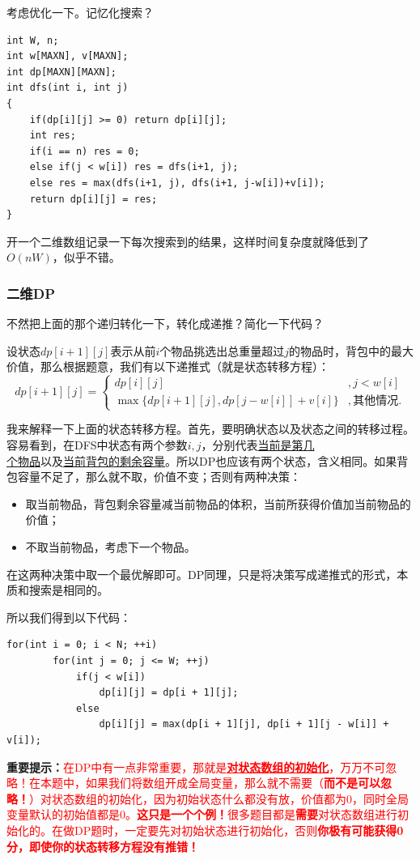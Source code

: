 \documentclass{article}
\theoremstyle{nonumberplain}
\begin{document}
考虑优化一下。记忆化搜索？
\begin{verbatim}
int W, n;    
int w[MAXN], v[MAXN];  
int dp[MAXN][MAXN];  
int dfs(int i, int j)
{  
    if(dp[i][j] >= 0) return dp[i][j];  
    int res;   
    if(i == n) res = 0; 
    else if(j < w[i]) res = dfs(i+1, j);   
    else res = max(dfs(i+1, j), dfs(i+1, j-w[i])+v[i]);  
    return dp[i][j] = res;  
}
\end{verbatim}

开一个二维数组记录一下每次搜索到的结果，这样时间复杂度就降低到了$O(nW)$，似乎不错。
\subsubsection{二维DP}
不然把上面的那个递归转化一下，转化成递推？简化一下代码？

设状态$dp[i+1][j]$表示从前$i$个物品挑选出总重量超过$j$的物品时，背包中的最大价值，那么根据题意，我们有以下递推式（就是状态转移方程）：
\begin{equation*}
	dp[i+1][j]=\begin{cases}
		dp[i][j]                        & ,j<w[i]   \\
		\max\{dp[i+1][j],dp[j-w[i]]+v[i]\} & ,其他情况.
	\end{cases}
\end{equation*}

我来解释一下上面的状态转移方程。首先，要明确状态以及状态之间的转移过程。容易看到，在DFS中状态有两个参数$i,j$，分别代表\underline{当前是第几}\\\underline{个物品}以及\underline{当前背包的剩余容量}。所以DP也应该有两个状态，含义相同。如果背包容量不足了，那么就不取，价值不变；否则有两种决策：
\begin{itemize}
	\item{取当前物品，背包剩余容量减当前物品的体积，当前所获得价值加当前物品的价值；}
	\item{不取当前物品，考虑下一个物品。}
\end{itemize}

在这两种决策中取一个最优解即可。DP同理，只是将决策写成递推式的形式，本质和搜索是相同的。

所以我们得到以下代码：

\begin{verbatim}
for(int i = 0; i < N; ++i)
        for(int j = 0; j <= W; ++j)
            if(j < w[i])
                dp[i][j] = dp[i + 1][j];
            else
                dp[i][j] = max(dp[i + 1][j], dp[i + 1][j - w[i]] + v[i]);
\end{verbatim}
\textbf{重要提示：}\textcolor{red}{在DP中有一点非常重要，那就是\underline{\textbf{对状态数组的初始化}}，万万不可忽略！在本题中，如果我们将数组开成全局变量，那么就不需要（\textbf{而不是可以忽略！}）对状态数组的初始化，因为初始状态什么都没有放，价值都为0，同时全局变量默认的初始值都是0。\textbf{这只是一个个例！}很多题目都是\textbf{需要}对状态数组进行初始化的。在做DP题时，一定要先对初始状态进行初始化，否则\textbf{你极有可能获得0分，即使你的状态转移方程没有推错！}}
\end{document}
